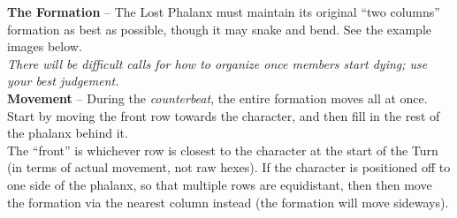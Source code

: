 \textbf{The Formation} -- The Lost Phalanx must maintain its original “two columns” formation as best as possible, though it may snake and bend. See the example images below.\\
\emph{There will be difficult calls for how to organize once members start dying; use your best judgement.}\\

\textbf{Movement} -- During the \emph{counterbeat}, the entire formation moves all at once. Start by moving the front row towards the character, and then fill in the rest of the phalanx behind it.\\
The “front” is whichever row is closest to the character at the start of the Turn (in terms of actual movement, not raw hexes). If the character is positioned off to one side of the phalanx, so that multiple rows are equidistant, then then move the formation via the nearest column instead (the formation will move sideways).

